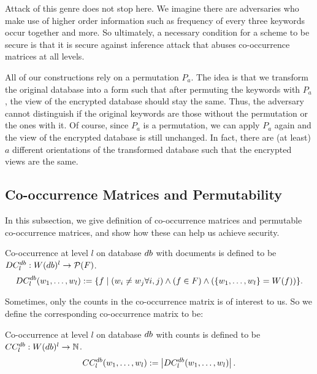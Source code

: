 Attack of this genre does not stop here. We imagine there are adversaries who make use of higher order information such as frequency of every three keywords occur together and more. So ultimately, a necessary condition for a scheme to be secure is that it is secure against inference attack that abuses co-occurrence matrices at all levels.

All of our constructions rely on a permutation $P_a$. The idea is that we transform the original database into a form such that after permuting the keywords with $P_a$, the view of the encrypted database should stay the same. Thus, the adversary cannot distinguish if the original keywords are those without the permutation or the ones with it. Of course, since $P_a$ is a permutation, we can apply $P_a$ again and the view of the encrypted database is still unchanged. In fact, there are (at least) $a$ different orientations of the transformed database such that the encrypted views are the same.




\subsection{Co-occurrence Matrices and Permutability}
In this subsection, we give definition of co-occurrence matrices and permutable co-occurrence matrices, and show how these can help us achieve security.

\begin{definition}
Co-occurrence at level $l$ on database $db$ with documents is defined to be $DC_{l}^{db}: W(db)^l \rightarrow \mathcal{P}(F)$.
\begin{equation}
	DC_{l}^{db}(w_1, \dots, w_l) := \{ f \mid  (w_i \neq w_j \forall i,j) \wedge (f \in F) \wedge (\{w_1, \dots, w_l\} = W(f)) \}.
\end{equation}
\end{definition}

Sometimes, only the counts in the co-occurrence matrix is of interest to us. So we define the corresponding co-occurrence matrix to be:
\begin{definition}
	Co-occurrence at level $l$ on database $db$ with counts is defined to be $CC_{l}^{db}: W(db)^l \rightarrow \mathbb{N}$.
	\begin{equation}
	CC_{l}^{db}(w_1, \dots, w_l) := \left| DC_{l}^{db}(w_1, \dots, w_l) \right|.
	\end{equation}
\end{definition}

